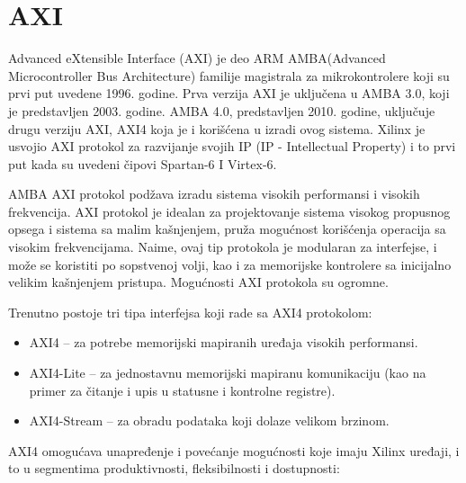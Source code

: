 \documentclass[a4paper, 12pt, diplomski]{etf}
\begin{document}
	\chapter{AXI}

	Advanced eXtensible Interface (AXI) je deo ARM AMBA(Advanced Microcontroller Bus Architecture) familije magistrala za mikrokontrolere koji su prvi put uvedene 1996. godine. Prva verzija AXI je uključena u AMBA 3.0, koji je predstavljen 2003. godine. AMBA 4.0, predstavljen 2010. godine, uključuje drugu verziju AXI, AXI4 koja je i korišćena u izradi ovog sistema. Xilinx je usvojio AXI protokol za razvijanje svojih IP (IP - Intellectual Property) i to prvi put kada su uvedeni čipovi Spartan-6 I Virtex-6. \cite{lit3}

	AMBA AXI protokol podžava izradu sistema visokih performansi i visokih frekvencija. AXI protokol je idealan za projektovanje sistema visokog propusnog opsega i sistema sa malim kašnjenjem,  pruža mogućnost korišćenja operacija sa visokim frekvencijama. Naime, ovaj tip protokola je modularan za interfejse, i može se koristiti po sopstvenoj volji, kao i za memorijske kontrolere sa inicijalno velikim kašnjenjem pristupa. Mogućnosti AXI protokola su ogromne.

	Trenutno postoje tri tipa interfejsa koji rade sa AXI4 protokolom:

	\begin{itemize}

		\item AXI4 – za potrebe memorijski mapiranih uređaja visokih performansi.
		\item AXI4-Lite – za jednostavnu memorijski mapiranu komunikaciju (kao na primer za čitanje i upis u statusne i kontrolne registre).
		\item AXI4-Stream – za obradu podataka koji dolaze velikom brzinom.

	\end{itemize}

	AXI4 omogućava unapređenje i povećanje mogućnosti koje imaju Xilinx uređaji, i to u segmentima produktivnosti, fleksibilnosti i dostupnosti:
\end{document}
